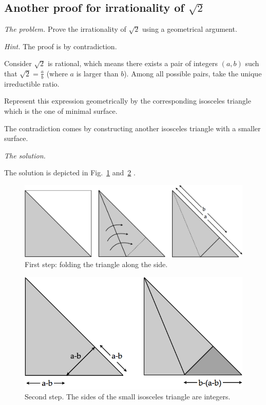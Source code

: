 \subsection{Another proof for irrationality of $\sqrt{2}$}


\noindent \textit{The problem.}
Prove the irrationality of $\sqrt{2}$ using a geometrical argument.
\medskip

\noindent \textit{Hint.}
The proof is by contradiction. 

Consider $\sqrt{2}$ is rational, which means there exists a pair of integers $(a,b)$
such that $\sqrt{2} = \frac{a}{b}$ (where $a$ is larger than $b$).
Among all possible pairs, take the unique irreductible ratio.

Represent this expression geometrically by the corresponding isosceles triangle
which is the one of minimal surface. 

The contradiction comes by constructing another isosceles triangle with a smaller surface.
\medskip

\noindent \textit{The solution.}

The solution is depicted in Fig.~\ref{Fig:sqrtbisInit} and~\ref{Fig:sqrtbisFin} . 
\begin{figure}
\begin{center}
        \includegraphics[scale=0.3]{FiguresArithmetic/sqrtbisInit}
        \caption{First step: folding the triangle along the side.}
        \label{Fig:sqrtbisInit}
\end{center}
\end{figure}
\begin{figure}
\begin{center}
        \includegraphics[scale=0.3]{FiguresArithmetic/sqrtbisFin}
        \caption{Second step. The sides of the small isosceles triangle are integers.}
        \label{Fig:sqrtbisFin}
\end{center}
\end{figure}



